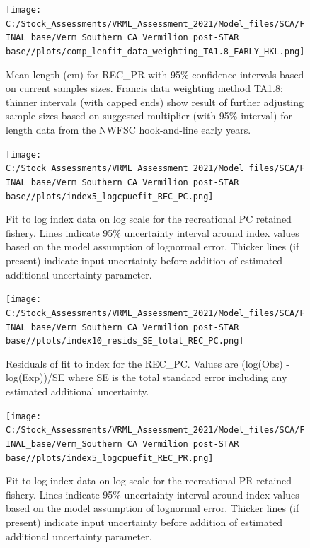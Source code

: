 \documentclass[11pt,
  english,
]{article}
\begin{document}
\begin{figure}
\centering
\texttt{[image: C:/Stock\_Assessments/VRML\_Assessment\_2021/Model\_files/SCA/FINAL\_base/Verm\_Southern CA Vermilion post-STAR base//plots/comp\_lenfit\_data\_weighting\_TA1.8\_EARLY\_HKL.png]}
\caption{Mean length (cm) for REC\_PR with 95\% confidence intervals based on current samples sizes. Francis data weighting method TA1.8: thinner intervals (with capped ends) show result of further adjusting sample sizes based on suggested multiplier (with 95\% interval) for length data from the NWFSC hook-and-line early years.\label{fig:mean-len-fit-EARLY-HKL}}
\end{figure}

\FloatBarrier

\FloatBarrier

\begin{figure}
\centering
\texttt{[image: C:/Stock\_Assessments/VRML\_Assessment\_2021/Model\_files/SCA/FINAL\_base/Verm\_Southern CA Vermilion post-STAR base//plots/index5\_logcpuefit\_REC\_PC.png]}
\caption{Fit to log index data on log scale for the recreational PC retained fishery. Lines indicate 95\% uncertainty interval around index values based on the model assumption of lognormal error. Thicker lines (if present) indicate input uncertainty before addition of estimated additional uncertainty parameter.\label{fig:log-cpue-REC-PC}}
\end{figure}

\begin{figure}
\centering
\texttt{[image: C:/Stock\_Assessments/VRML\_Assessment\_2021/Model\_files/SCA/FINAL\_base/Verm\_Southern CA Vermilion post-STAR base//plots/index10\_resids\_SE\_total\_REC\_PC.png]}
\caption{Residuals of fit to index for the REC\_PC. Values are (log(Obs) - log(Exp))/SE where SE is the total standard error including any estimated additional uncertainty.\label{fig:cpue-resid-REC-PC}}
\end{figure}

\begin{figure}
\centering
\texttt{[image: C:/Stock\_Assessments/VRML\_Assessment\_2021/Model\_files/SCA/FINAL\_base/Verm\_Southern CA Vermilion post-STAR base//plots/index5\_logcpuefit\_REC\_PR.png]}
\caption{Fit to log index data on log scale for the recreational PR retained fishery. Lines indicate 95\% uncertainty interval around index values based on the model assumption of lognormal error. Thicker lines (if present) indicate input uncertainty before addition of estimated additional uncertainty parameter.\label{fig:log-cpue-REC-PR}}
\end{figure}
\end{document}
